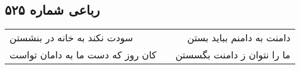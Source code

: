 \begin{center}
\section*{رباعی شماره ۵۲۵}
\label{sec:sh525}
\begin{longtable}{l p{0.5cm} r}
سودت نکند به خانه در بنشستن
&&
دامنت به دامنم بباید بستن
\\
کان روز که دست ما به دامان تواست
&&
ما را نتوان ز دامنت بگسستن
\\
\end{longtable}
\end{center}

